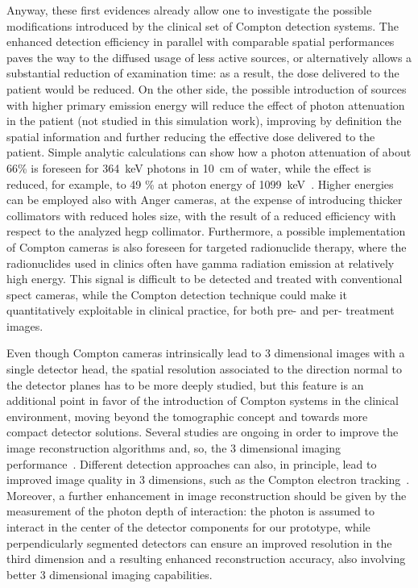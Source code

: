 Anyway, these first evidences already allow one to investigate the possible modifications introduced by the clinical set of Compton detection systems. The enhanced detection efficiency in parallel with comparable spatial performances paves the way to the diffused usage of less active sources, or alternatively allows a substantial reduction of examination time: as a result, the dose delivered to the patient would be reduced. On the other side, the possible introduction of sources with higher primary emission energy will reduce the effect of photon attenuation in the patient (not studied in this simulation work), improving by definition the spatial information and further reducing the effective dose delivered to the patient. Simple analytic calculations can show how a photon attenuation of about 66\% is foreseen for 364~keV photons in 10~cm of water, while the effect is reduced, for example, to 49 \% at photon energy of 1099~keV~\parencite{Hubbell1987}. Higher energies can be employed also with Anger cameras, at the expense of introducing thicker collimators with reduced holes size, with the result of a reduced efficiency with respect to the analyzed \gls{hegp} collimator.
Furthermore, a possible implementation of Compton cameras is also foreseen for targeted radionuclide therapy, where the radionuclides used in clinics often have gamma radiation emission at relatively high energy. This signal is difficult to be detected and treated with conventional \gls{spect} cameras, while the Compton detection technique could make it quantitatively exploitable in clinical practice, for both pre- and per- treatment images.
   
Even though Compton cameras intrinsically lead to 3 dimensional images with a single detector head, the spatial resolution associated to the direction normal to the detector planes has to be more deeply studied, but this feature is an additional point in favor of the introduction of Compton systems in the clinical environment, moving beyond the tomographic concept and towards more compact detector solutions. Several studies are ongoing in order to improve the image reconstruction algorithms and, so, the 3 dimensional imaging performance~\parencite{Kuchment2016}. Different detection approaches can also, in principle, lead to improved image quality in 3 dimensions, such as the Compton electron tracking~\parencite{Sonoda2015, Kabuki2007}. Moreover, a further enhancement in image reconstruction should be given by the measurement of the photon depth of interaction: the photon is assumed to interact in the center of the detector components for our prototype, while perpendicularly segmented detectors can ensure an improved resolution in the third dimension and a resulting enhanced reconstruction accuracy, also involving better 3 dimensional imaging capabilities. 

